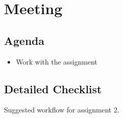 \section{Meeting \meet}
\subsection{Agenda}

\begin{itemize}
    \item Work with the assignment
\end{itemize}
\subsection{Detailed Checklist}
Suggested workflow for assignment 2.
